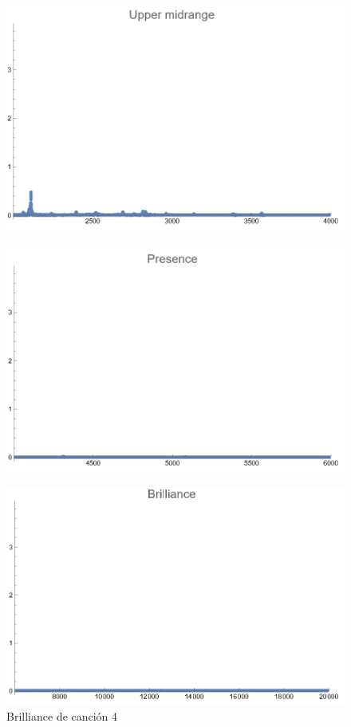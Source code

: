 \documentclass[12pt, letterpaper]{article}
\begin{document}
\begin{figure}[H]
  \centering
  \begin{minipage}{.5\textwidth}
    \centering
    \includegraphics[width=.9\linewidth]{imgs/Cancion4/upmid.png}
    \label{fig:04f}
  \end{minipage}%
  \begin{minipage}{.5\textwidth}
    \centering
    \includegraphics[width=.9\linewidth]{imgs/Cancion4/presence.png}
    \label{fig:04g}
  \end{minipage}
\end{figure}
\begin{figure}[H]
  \centering
  \includegraphics[width=.45\linewidth]{imgs/Cancion4/brilliance.png}
  \caption{Brilliance de canción 4}
  \label{fig:04h}
\end{figure}
\end{document}
